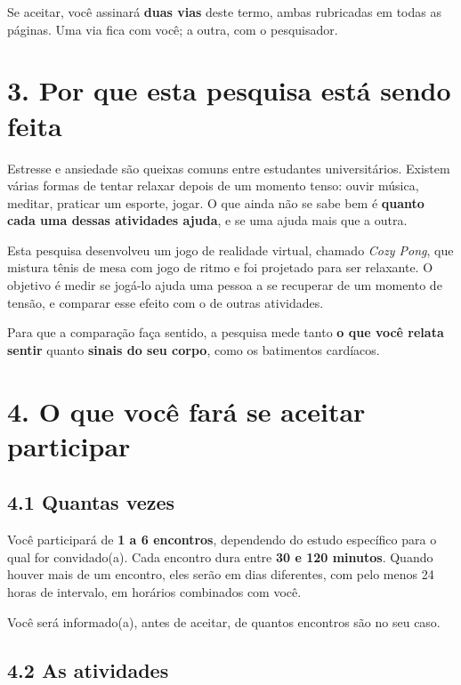\documentclass[12pt,a4paper]{article}
\begin{document}
Se aceitar, você assinará \textbf{duas vias} deste termo, ambas rubricadas em
todas as páginas. Uma via fica com você; a outra, com o pesquisador.

\section*{3. Por que esta pesquisa está sendo feita}

Estresse e ansiedade são queixas comuns entre estudantes universitários. Existem
várias formas de tentar relaxar depois de um momento tenso: ouvir música,
meditar, praticar um esporte, jogar. O que ainda não se sabe bem é \textbf{quanto
cada uma dessas atividades ajuda}, e se uma ajuda mais que a outra.

Esta pesquisa desenvolveu um jogo de realidade virtual, chamado \textit{Cozy
Pong}, que mistura tênis de mesa com jogo de ritmo e foi projetado para ser
relaxante. O objetivo é medir se jogá-lo ajuda uma pessoa a se recuperar de um
momento de tensão, e comparar esse efeito com o de outras atividades.

Para que a comparação faça sentido, a pesquisa mede tanto \textbf{o que você
relata sentir} quanto \textbf{sinais do seu corpo}, como os batimentos cardíacos.

\section*{4. O que você fará se aceitar participar}

\subsection*{4.1 Quantas vezes}

Você participará de \textbf{1 a 6 encontros}, dependendo do estudo específico
para o qual for convidado(a). Cada encontro dura entre \textbf{30 e 120
minutos}. Quando houver mais de um encontro, eles serão em dias diferentes, com
pelo menos 24 horas de intervalo, em horários combinados com você.

Você será informado(a), antes de aceitar, de quantos encontros são no seu caso.

\subsection*{4.2 As atividades}
\end{document}
